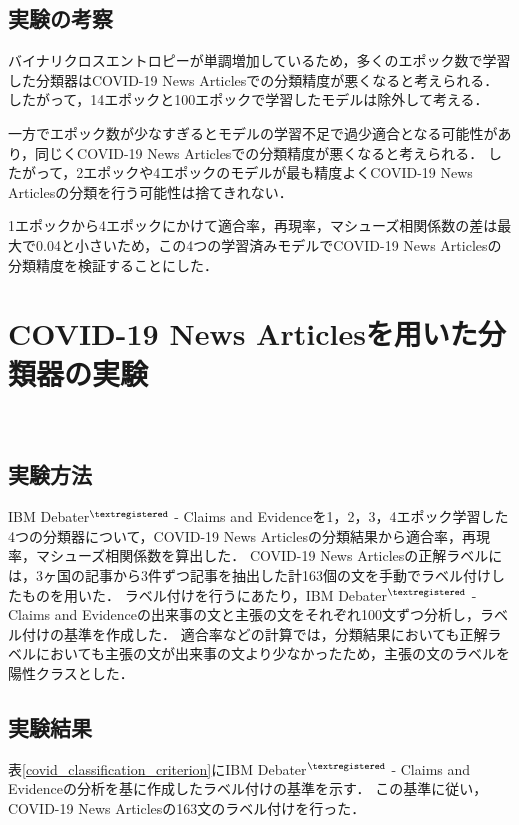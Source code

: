 \documentclass[12pt,a4j]{jreport}
\begin{document}
\subsection{実験の考察}
バイナリクロスエントロピーが単調増加しているため，多くのエポック数で学習した分類器はCOVID-19 News Articlesでの分類精度が悪くなると考えられる．
したがって，14エポックと100エポックで学習したモデルは除外して考える．

一方でエポック数が少なすぎるとモデルの学習不足で過少適合となる可能性があり，同じくCOVID-19 News Articlesでの分類精度が悪くなると考えられる．
したがって，2エポックや4エポックのモデルが最も精度よくCOVID-19 News Articlesの分類を行う可能性は捨てきれない．

1エポックから4エポックにかけて適合率，再現率，マシューズ相関係数の差は最大で0.04と小さいため，この4つの学習済みモデルでCOVID-19 News Articlesの分類精度を検証することにした．

\section{COVID-19 News Articlesを用いた分類器の実験}
\label{section_covid_classification_experiment}
~

\subsection{実験方法}
IBM Debater$^{\textregistered}$ - Claims and Evidenceを1，2，3，4エポック学習した4つの分類器について，COVID-19 News Articlesの分類結果から適合率，再現率，マシューズ相関係数を算出した．
COVID-19 News Articlesの正解ラベルには，3ヶ国の記事から3件ずつ記事を抽出した計163個の文を手動でラベル付けしたものを用いた．
ラベル付けを行うにあたり，IBM Debater$^{\textregistered}$ - Claims and Evidenceの出来事の文と主張の文をそれぞれ100文ずつ分析し，ラベル付けの基準を作成した．
適合率などの計算では，分類結果においても正解ラベルにおいても主張の文が出来事の文より少なかったため，主張の文のラベルを陽性クラスとした．


\subsection{実験結果}
表\ref{covid_classification_criterion}にIBM Debater$^{\textregistered}$ - Claims and Evidenceの分析を基に作成したラベル付けの基準を示す．
この基準に従い，COVID-19 News Articlesの163文のラベル付けを行った．
\end{document}
